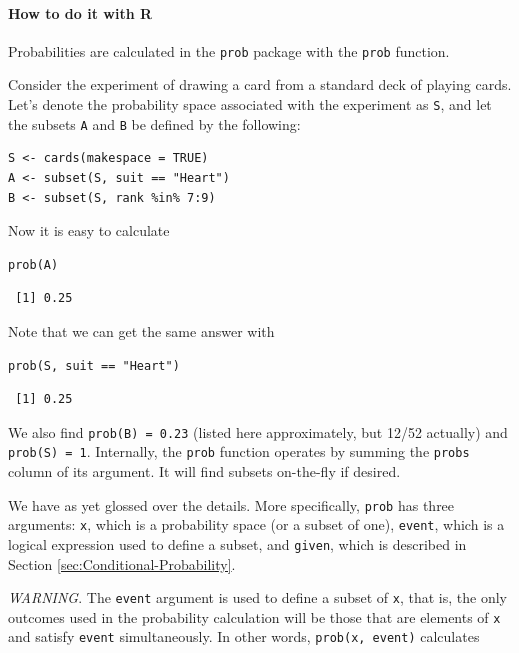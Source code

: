 \documentclass[captions=tableheading]{scrbook}
\begin{document}
\paragraph*{How to do it with \textsf{R}}

Probabilities are calculated in the \texttt{prob} package with the \texttt{prob} function.

Consider the experiment of drawing a card from a standard deck of playing cards. Let's denote the probability space associated with the experiment as \texttt{S}, and let the subsets \texttt{A} and \texttt{B} be defined by the following: 


\begin{verbatim}
S <- cards(makespace = TRUE) 
A <- subset(S, suit == "Heart") 
B <- subset(S, rank %in% 7:9)
\end{verbatim}

Now it is easy to calculate 


\begin{verbatim}
prob(A)
\end{verbatim}

\begin{verbatim}
 [1] 0.25
\end{verbatim}

Note that we can get the same answer with 


\begin{verbatim}
prob(S, suit == "Heart")
\end{verbatim}

\begin{verbatim}
 [1] 0.25
\end{verbatim}

We also find \texttt{prob(B) = 0.23} (listed here approximately, but 12/52 actually) and \texttt{prob(S) = 1}. Internally, the \texttt{prob} function operates by summing the \texttt{probs} column of its argument. It will find subsets on-the-fly if desired.

We have as yet glossed over the details. More specifically, \texttt{prob} has three arguments: \texttt{x}, which is a probability space (or a subset of one), \texttt{event}, which is a logical expression used to define a subset, and \texttt{given}, which is described in Section \ref{sec:Conditional-Probability}.

\emph{WARNING}. The \texttt{event} argument is used to define a subset of \texttt{x}, that is, the only outcomes used in the probability calculation will be those that are elements of \texttt{x} and satisfy \texttt{event} simultaneously. In other words, \texttt{prob(x, event)} calculates 
\end{document}

